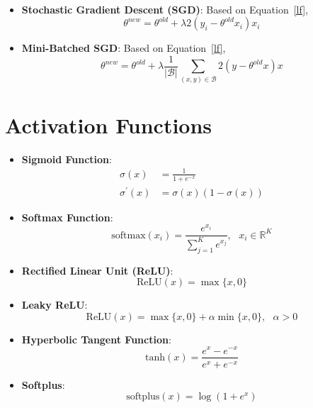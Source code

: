 \documentclass[a4paper]{article}
\begin{document}
\begin{itemize}
\begin{align}
	\end{align}
	\item \textbf{Stochastic Gradient Descent (SGD)}: Based on Equation~\ref{lf},
	\begin{equation}
		{\theta}^{new} = {\theta}^{old} + \lambda 2 (y_i - {\theta}^{old} x_i) x_i
	\end{equation}
	\item \textbf{Mini-Batched SGD}: Based on Equation~\ref{lf},
	\begin{equation}
		{\theta}^{new} = {\theta}^{old} + \lambda \frac{1}{|\mathcal{B}|} \sum_{(x, y) \in \mathcal{B}} 2 (y - {\theta}^{old} x) x
	\end{equation}
\end{itemize}

\section{Activation Functions}

\begin{itemize}
	\item \textbf{Sigmoid Function}:
	\begin{align}
		\sigma (x) &= \frac{1}{1 + e^{-x}} \\
		\sigma^{\prime} (x) &= \sigma (x) (1 - \sigma(x))
	\end{align}
	\item \textbf{Softmax Function}: 
	\begin{equation}
		\text{softmax} (x_i) = \frac{e^{x_i}}{\sum_{j=1}^{K} e^{x_j}},\,\,\,\, x_i \in \mathbb{R}^K
	\end{equation}
	\item \textbf{Rectified Linear Unit (ReLU)}:
	\begin{equation}
		\text{ReLU} (x) = \max \{ x, 0 \}
	\end{equation}
	\item \textbf{Leaky ReLU}:
	\begin{equation}
		\text{ReLU} (x) = \max \{ x, 0 \} + \alpha \min \{ x, 0 \},\,\,\,\, \alpha > 0
	\end{equation}
	\item \textbf{Hyperbolic Tangent Function}:
	\begin{equation}
		\text{tanh} (x) = \frac{e^x - e^{-x}}{e^x + e^{-x}}
	\end{equation}
	\item \textbf{Softplus}:
	\begin{equation}
		\text{softplus} (x) = \log (1 + e^x)
	\end{equation}
\end{itemize}
\end{document}
